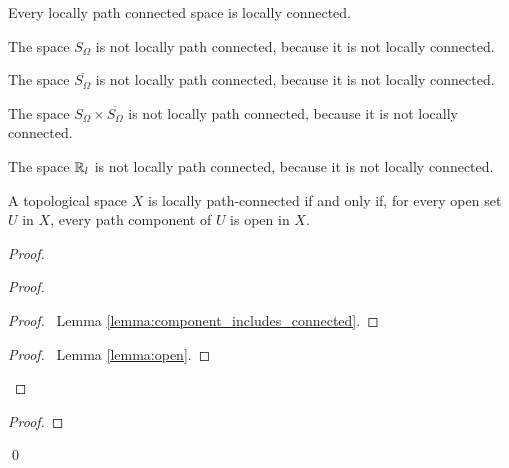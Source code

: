 \begin{proposition}
    Every locally path connected space is locally connected.
\end{proposition}

\begin{example}
    The space $S_\Omega$ is not locally path connected, because it is not locally connected.
\end{example}

\begin{example}
    The space $\overline{S_\Omega}$ is not locally path connected, because it is not locally connected.
\end{example}

\begin{example}
    The space $S_\Omega \times \overline{S_\Omega}$ is not locally path connected, because it is not locally connected.
\end{example}

\begin{example}
    The space $\mathbb{R}_l$ is not locally path connected, because it is not locally connected.
\end{example}

\begin{theorem}
    \label{theorem:open_path_component_locally_path_connected}
    A topological space $X$ is locally path-connected if and only if, for every
    open set $U$ in $X$, every path component of $U$ is open in $X$.
\end{theorem}

\begin{proof}
    \pf
    \begin{proof}
        \begin{proof}
            \pf\ Lemma \ref{lemma:component_includes_connected}.
        \end{proof}
        \qedstep
        \begin{proof}
            \pf\ Lemma \ref{lemma:open}.
        \end{proof}
    \end{proof}
    \begin{proof}
    \end{proof}
    \qed
\end{proof}

